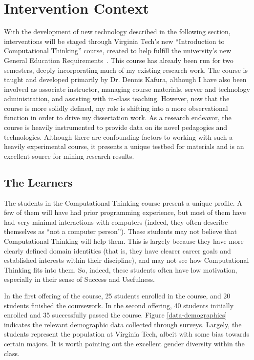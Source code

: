 \section{Intervention Context}

With the development of new technology described in the following section, interventions will be staged through Virginia Tech's new ``Introduction to Computational Thinking'' course, created to help fulfill the university's new General Education Requirements~\cite{vt-vision}. 
This course has already been run for two semesters, deeply incorporating much of my existing research work.
The course is taught and developed primarily by Dr. Dennis Kafura, although I have also been involved as associate instructor, managing course materials, server and technology administration, and assisting with in-class teaching.
However, now that the course is more solidly defined, my role is shifting into a more observational function in order to drive my dissertation work.
As a research endeavor, the course is heavily instrumented to provide data on its novel pedagogies and technologies.
Although there are confounding factors to working with such a heavily experimental course, it presents a unique testbed for materials and is an excellent source for mining research results.

\subsection{The Learners}

The students in the Computational Thinking course present a unique profile.
A few of them will have had prior programming experience, but most of them have had very minimal interactions with computers (indeed, they often describe themselves as ``not a computer person'').
These students may not believe that Computational Thinking will help them.
This is largely because they have more clearly defined domain identities (that is, they have clearer career goals and established interests within their discipline), and may not see how Computational Thinking fits into them.
So, indeed, these students often have low motivation, especially in their sense of Success and Usefulness.

In the first offering of the course, 25 students enrolled in the course, and 20 students finished the coursework.
In the second offering, 40 students initially enrolled and 35 successfully passed the course.
Figure \ref{data-demographics} indicates the relevant demographic data collected through surveys.
Largely, the students represent the population at Virginia Tech, albeit with some bias towards certain majors.
It is worth pointing out the excellent gender diversity within the class.

